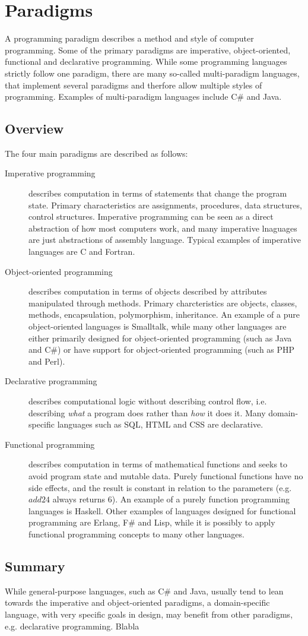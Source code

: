 \section{Paradigms}

A programming paradigm describes a method and style of computer programming.
Some of the primary paradigms are imperative, object-oriented, functional and declarative programming. While some programming languages strictly follow one paradigm, there are many so-called multi-paradigm languages, that implement several paradigms and therfore allow multiple styles of programming. Examples of multi-paradigm languages include C\# and Java.

\subsection{Overview}
The four main paradigms are described as follows:
\begin{description}
\item[Imperative programming] describes computation in terms of statements that change the program state. Primary characteristics are assignments, procedures, data structures, control structures. Imperative programming can be seen as a direct abstraction of how most computers work, and many imperative lnaguages are just abstractions of assembly language. Typical examples of imperative languages are C and Fortran.
\item[Object-oriented programming] describes computation in terms of objects described by attributes manipulated through methods. Primary charcteristics are objects, classes, methods, encapsulation, polymorphism, inheritance. An example of a pure object-oriented languages is Smalltalk, while many other languages are either primarily designed for object-oriented programming (such as Java and C\#) or have support for object-oriented programming (such as PHP and Perl).
\item[Declarative programming] describes computational logic without describing control flow, i.e. describing {\em what} a program does rather than {\em how} it does it. Many domain-specific languages such as SQL, HTML and CSS are declarative.  
\item[Functional programming] describes computation in terms of mathematical functions and seeks to avoid program state and mutable data. Purely functional functions have no side effects, and the result is constant in relation to the parameters (e.g. $add 2 4$ always returns $6$). An example of a purely function programming languages is Haskell. Other examples of languages designed for functional programming are Erlang, F# and Lisp, while it is possibly to apply functional programming concepts to many other languages.
\end{description}

\subsection{Summary}

While general-purpose languages, such as C\# and Java, usually tend to lean towards the imperative and object-oriented paradigms, a domain-specific language, with very specific goals in design, may benefit from other paradigms, e.g. declarative programming.
Blabla
